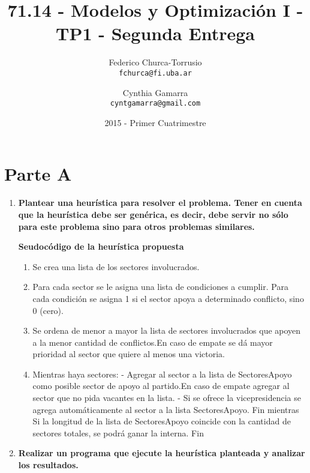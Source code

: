 \documentclass[10pt, a4paper, titlepage,
	oneside,
	fleqn, leqno]{article}
\title{71.14 - Modelos y Optimización I - TP1 - Segunda Entrega}
\author{
	Federico Churca-Torrusio \\\texttt{fchurca@fi.uba.ar}
	\and
	Cynthia Gamarra \\\texttt{cyntgamarra@gmail.com}}
\date{2015 - Primer Cuatrimestre}
\let\oldsection\section
\def\section{\cleardoublepage\oldsection}
\begin{document}
\maketitle

\cleardoublepage
{}
\setcounter{page}{1}

\section{Parte A}
\begin{enumerate} [a .]
\item \textbf{Plantear una heurística para resolver el problema. Tener en cuenta que la heurística debe ser genérica, es decir, debe servir no sólo para este problema sino para otros problemas similares.}\\
\begin{center}
\textbf{Seudocódigo de la heurística propuesta}
\end{center}
\begin{enumerate}
\item Se crea una lista de los sectores involucrados.
\item Para cada sector se le asigna una lista de condiciones a cumplir. Para cada condición se asigna 1 si el sector apoya a determinado conflicto, sino 0 (cero).
\item Se ordena de menor a mayor la lista de sectores involucrados que apoyen a la menor cantidad de conflictos.En caso de empate se dá mayor prioridad al sector que quiere al menos una victoria.
\item Mientras haya sectores:
 - Agregar al sector a la lista de SectoresApoyo como posible sector de apoyo al partido.En caso de empate agregar al sector que no pida vacantes en la lista.
 - Si se ofrece la vicepresidencia se agrega automáticamente al sector a la lista SectoresApoyo.
 Fin mientras
 Si la longitud de la lista de SectoresApoyo coincide con la cantidad de sectores totales, se podrá ganar la interna.
 Fin
\end{enumerate}

\item \textbf{Realizar un programa que ejecute la heurística planteada y analizar los resultados.}



\end{enumerate}
\end{document}
